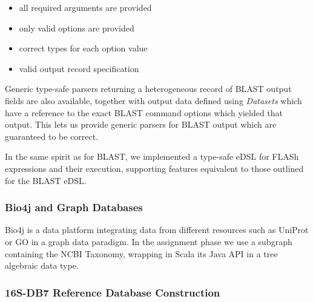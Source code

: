 \documentclass[fleqn,10pt,lineno]{wlpeerj}
\providecommand{\tightlist}{%
\setlength{\itemsep}{0pt}\setlength{\parskip}{0pt}}
\begin{document}
\begin{itemize}
\tightlist
\item
  all required arguments are provided
\item
  only valid options are provided
\item
  correct types for each option value
\item
  valid output record specification
\end{itemize}

Generic type-safe parsers returning a heterogeneous record of BLAST
output fields are also available, together with output data defined
using \emph{Datasets} which have a reference to the exact BLAST command
options which yielded that output. This lets us provide generic parsers
for BLAST output which are guaranteed to be correct.

In the same spirit as for BLAST, we implemented a type-safe eDSL for
FLASh expressions and their execution, supporting features equivalent to
those outlined for the BLAST eDSL.

\subsubsection{Bio4j and Graph
Databases}\label{bio4j-and-graph-databases}

Bio4j \citep{pareja2015bio4j} is a data platform integrating data from
different resources such as UniProt or GO in a graph data paradigm. In
the assignment phase we use a subgraph containing the NCBI Taxonomy,
wrapping in Scala its Java API in a tree algebraic data type.

\subsubsection{16S-DB7 Reference Database
Construction}\label{s-db7-reference-database-construction}
\end{document}
